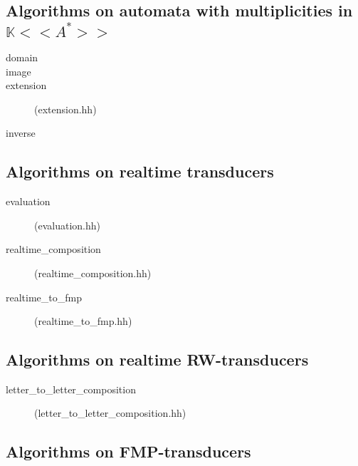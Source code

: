 \documentclass[a4paper]{report}
\begin{document}
\subsection{Algorithms on automata with multiplicities in $\mathbb{K}<<A^*>>$}

\begin{description}
\item[domain]
\item[image]
\item[extension] (extension.hh)
\item[inverse]
\end{description}

\subsection{Algorithms on realtime transducers}

\begin{description}
\item[evaluation] (evaluation.hh)
\item[realtime\_composition] (realtime\_composition.hh)
\item[realtime\_to\_fmp] (realtime\_to\_fmp.hh)
\end{description}

\subsection{Algorithms on realtime RW-transducers}

\begin{description}
\item[letter\_to\_letter\_composition] (letter\_to\_letter\_composition.hh)
\end{description}

\subsection{Algorithms on FMP-transducers}
\end{document}
